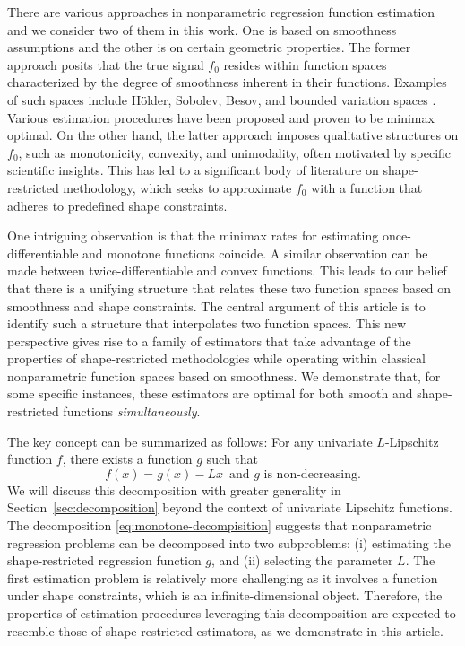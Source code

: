 \documentclass[12pt]{article}
\begin{document}
There are various approaches in nonparametric regression function estimation and we consider two of them in this work. One is based on smoothness assumptions and the other is on certain geometric properties. The former approach posits that the true signal $f_0$ resides within function spaces characterized by the degree of smoothness inherent in their functions. Examples of such spaces include H\"{o}lder, Sobolev, Besov, and bounded variation spaces \cite[Chapter 4]{gine2021mathematical}. Various estimation procedures have been proposed and proven to be minimax optimal. On the other hand, the latter approach imposes qualitative structures on $f_0$, such as monotonicity, convexity, and unimodality, often motivated by specific scientific insights. This has led to a significant body of literature on shape-restricted methodology, which seeks to approximate $f_0$ with a function that adheres to predefined shape constraints. 

One intriguing observation is that the minimax rates for estimating once-differentiable and monotone functions coincide. A similar observation can be made between twice-differentiable and convex functions. This leads to our belief that there is a unifying structure that relates these two function spaces based on smoothness and shape constraints. The central argument of this article is to identify such a structure that interpolates two function spaces. This new perspective gives rise to a family of estimators that take advantage of the properties of shape-restricted methodologies while operating within classical nonparametric function spaces based on smoothness. We demonstrate that, for some specific instances, these estimators are optimal for both smooth and shape-restricted functions \emph{simultaneously}.

The key concept can be summarized as follows: For any univariate $L$-Lipschitz function $f$, there exists a function $g$ such that 
\begin{equation}\label{eq:monotone-decompisition}
    f(x) = g(x) - Lx \, \text{ and $g$ is non-decreasing}.
\end{equation}
We will discuss this decomposition with greater generality in Section~\ref{sec:decomposition} beyond the context of univariate Lipschitz functions. The decomposition \eqref{eq:monotone-decompisition} suggests that nonparametric regression problems can be decomposed into two subproblems: (i) estimating the shape-restricted regression function $g$, and (ii) selecting the parameter $L$. The first estimation problem is relatively more challenging as it involves a function under shape constraints, which is an infinite-dimensional object. Therefore, the properties of estimation procedures leveraging this decomposition are expected to resemble those of shape-restricted estimators, as we demonstrate in this article.
\end{document}
